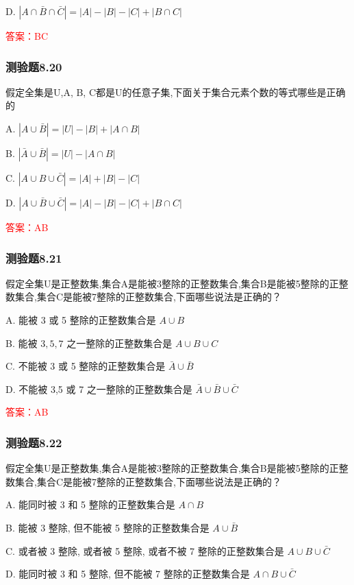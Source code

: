 \documentclass[UTF8, heading=true]{ctexart}
\begin{document}
D. $|A \cap \bar{B} \cap \bar{C}|=|A|-|B|-|C|+|B \cap C|$

\textcolor{red}{答案：BC}

\subsubsection{测验题8.20}

假定全集是U,A, B, C都是U的任意子集,下面关于集合元素个数的等式哪些是正确的

A. $|A \cup \bar{B}|=|U|-|B|+|A \cap B|$

B. $|\bar{A} \cup \bar{B}|=|U|-|A \cap B|$

C. $|A \cup B \cup \bar{C}|=|A|+|B|-|C|$

D. $|A \cup \bar{B} \cup \bar{C}|=|A|-|B|-|C|+|B \cap C|$

\textcolor{red}{答案：AB}

\subsubsection{测验题8.21}

假定全集U是正整数集,集合A是能被3整除的正整数集合,集合B是能被5整除的正整数集合,集合C是能被7整除的正整数集合,下面哪些说法是正确的？

A. 能被 3 或 5 整除的正整数集合是 $A \cup B$

B. 能被 $3,5,7$ 之一整除的正整数集合是 $A \cup B \cup C$

C. 不能被 3 或 5 整除的正整数集合是 $\bar{A} \cup \bar{B}$

D. 不能被 3,5 或 7 之一整除的正整数集合是 $\bar{A} \cup \bar{B} \cup \bar{C}$

\textcolor{red}{答案：AB}

\subsubsection{测验题8.22}

假定全集U是正整数集,集合A是能被3整除的正整数集合,集合B是能被5整除的正整数集合,集合C是能被7整除的正整数集合,下面哪些说法是正确的？

A. 能同时被 3 和 5 整除的正整数集合是 $A \cap B$

B. 能被 3 整除, 但不能被 5 整除的正整数集合是 $A \cup \bar{B}$

C. 或者被 3 整除, 或者被 5 整除, 或者不被 7 整除的正整数集合是 $A \cup B \cup \bar{C}$

D. 能同时被 3 和 5 整除, 但不能被 7 整除的正整数集合是 $A \cap B \cup \bar{C}$
\end{document}
